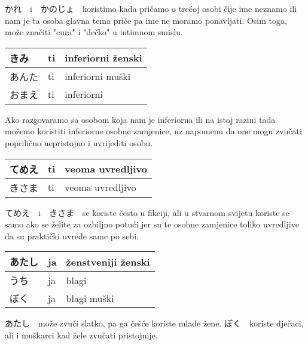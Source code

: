 	かれ　i　かのじょ　koristimo kada pričamo o trećoj osobi čije ime neznamo ili nam je ta osoba glavna tema priče pa ime ne moramo ponavljati. Osim toga, može značiti "cura" i "dečko" u intimnom smislu.
	
	\begin{reibun}
	\end{reibun}
	
	
	\begin{tabular}{|l|l|l|}
		\hline
		きみ&ti&inferiorni ženski\\\hline
		あんた&ti&inferiorni muški\\\hline
		おまえ&ti&inferiorni\\\hline
	\end{tabular}
	
	\vspace{10pt}
	
		Ako razgovaramo sa osobom koja nam je inferiorna ili na istoj razini tada možemo koristiti inferiorne osobne zamjenice, uz napomenu da one mogu zvučati poprilično nepristojno i uvrijediti osobu.
		
	\vspace{10pt}
	
	\begin{tabular}{|l|l|l|}
		\hline
		てめえ&ti&veoma uvredljivo\\\hline
		きさま&ti&veoma uvredljivo\\\hline
	\end{tabular}
	
	\vspace{10pt}
	
		てめえ　i　きさま　se koriste često u fikciji, ali u stvarnom svijetu koriste se samo ako se želite za ozbiljno potući jer su te osobne zamjenice toliko uvredljive da su praktički uvrede same po sebi.
		
		\vspace{100pt}
		
	\begin{tabular}{|l|l|l|}
		\hline
		あたし&ja&ženstveniji ženski\\\hline
		うち&ja&blagi\\\hline
		ぼく&ja&blagi muški\\\hline
	\end{tabular}
	
	\vspace{10pt}
	
	あたし　može zvuči slatko, pa ga češće koriste mlađe žene. ぼく　koriste dječaci, ali i muškarci kad žele zvučati pristojnije.
	
